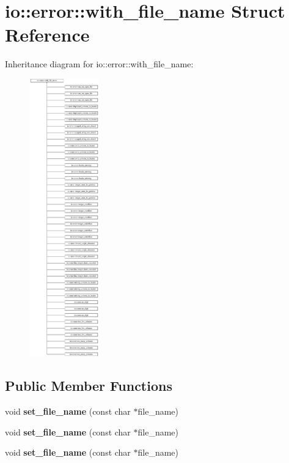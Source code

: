 \hypertarget{structio_1_1error_1_1with__file__name}{}\section{io\+:\+:error\+:\+:with\+\_\+file\+\_\+name Struct Reference}
\label{structio_1_1error_1_1with__file__name}
Inheritance diagram for io\+:\+:error\+:\+:with\+\_\+file\+\_\+name\+:\begin{figure}[H]
\begin{center}
\leavevmode
\includegraphics[height=12.000000cm]{d0/d77/structio_1_1error_1_1with__file__name}
\end{center}
\end{figure}
\subsection*{Public Member Functions}
\begin{DoxyCompactItemize}
\item 
\mbox{\label{structio_1_1error_1_1with__file__name_ae765de62778c989d4658b4efe2995390}} 
void {\bfseries set\+\_\+file\+\_\+name} (const char $\ast$file\+\_\+name)
\item 
\mbox{\label{structio_1_1error_1_1with__file__name_ae765de62778c989d4658b4efe2995390}} 
void {\bfseries set\+\_\+file\+\_\+name} (const char $\ast$file\+\_\+name)
\item 
\mbox{\label{structio_1_1error_1_1with__file__name_ae765de62778c989d4658b4efe2995390}} 
void {\bfseries set\+\_\+file\+\_\+name} (const char $\ast$file\+\_\+name)
\end{DoxyCompactItemize}
